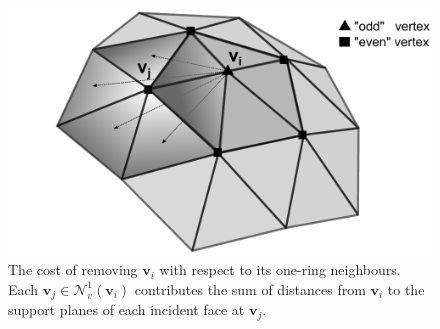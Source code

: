 \documentclass[graybox]{svmult}
\begin{document}
	\begin{figure}[t]
		\centering
		\includegraphics[width=.9\linewidth]{oneRingCost.pdf}
		\caption{\label{fig_cds:oneRingCost}
			The cost of removing $\mathbf{v}_i$ with respect to its one-ring neighbours. Each $\mathbf{v}_j \in \mathcal{N}_v^1(\mathbf{v}_i)$ contributes
			the sum of distances from $\mathbf{v}_i$ to the support planes of each incident face at $\mathbf{v}_j$.}
	\end{figure}
	
\end{document}
